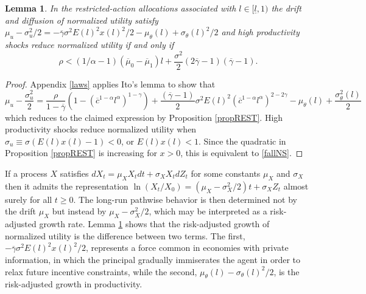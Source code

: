 \documentclass[11pt]{article}
\theoremstyle{plain}
\newtheorem{lemma}[thm]{Lemma}
\begin{document}
\begin{lemma}\label{lawu}
In the restricted-action allocations associated with $l \in [\underline{l},1)$ the drift and diffusion of normalized utility satisfy $\mu_u - \sigma_u^2/2 = -\overline{\gamma}\sigma^2E(l)^2x(l)^2/2 - \mu_{\theta}(l) + \sigma_{\theta}(l)^2/2$ and high productivity shocks reduce normalized utility if and only if 
\begin{equation}
\rho < (1/\alpha-1)(\overline{\mu}_0 - \overline{\mu}_1)l + \frac{\sigma^2}{2}{\left(2\overline{\gamma}-1\right)} (\overline{\gamma}-1).
\label{fallNS} 
\end{equation}
\end{lemma}
\begin{proof}
Appendix \ref{laws} applies Ito's lemma to show that
\begin{equation}
\mu_u - \frac{\sigma_u^2}{2} = \frac{\rho}{1-\overline{\gamma}}(1 - (\overline{c}^{1-\alpha}l^{\alpha})^{1-\gamma}) + \frac{(\overline{\gamma}-1)}{2} \sigma^2 E(l)^2 (\overline{c}^{1-\alpha}l^{\alpha})^{2-2\gamma} - \mu_{\theta}(l) + \frac{\sigma_{\theta}^2(l)}{2}
\label{riskADJ}
\end{equation}
which reduces to the claimed expression by Proposition \ref{propREST}. High productivity shocks reduce normalized utility when $\sigma_u \equiv \sigma (E(l)x(l) - 1) < 0$, or $E(l)x(l) < 1$. Since the quadratic in Proposition \ref{propREST} is increasing for $x>0$, this is equivalent to \eqref{fallNS}.
\end{proof}


If a process $X$ satisfies $dX_t = \mu_XX_tdt + \sigma_XX_tdZ_t$ for some constants $\mu_X$ and $\sigma_X$ then it admits the representation $\ln(X_t/X_0) = (\mu_X - \sigma_X^2/2)t + \sigma_XZ_t$ almost surely for all $t\geq0$. The long-run pathwise behavior is then determined not by the drift $\mu_X$ but instead by $\mu_X - \sigma_X^2/2$, which may be interpreted as a risk-adjusted growth rate. Lemma \ref{lawu} shows that the risk-adjusted growth of normalized utility is the difference between two terms. The first, $-\overline{\gamma}\sigma^2E(l)^2x(l)^2/2$, represents a force common in economies with private information, in which the principal gradually immiserates the agent in order to relax future incentive constraints, while the second, $\mu_{\theta}(l) - \sigma_{\theta}(l)^2/2$, is the risk-adjusted growth in productivity. 
\end{document}

